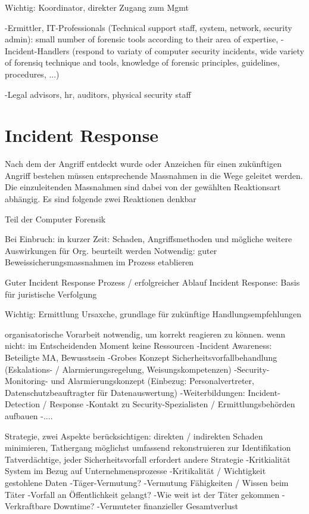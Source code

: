 Wichtig: Koordinator, direkter Zugang zum Mgmt

-Ermittler, IT-Professionals (Technical support staff, system, network, security admin): small number of forensic tools according to their area of expertise, 
-Incident-Handlers (respond to variaty of computer security incidents, wide variety of forensiq technique and tools, knowledge of forensic principles, guidelines, procedures, ...)

-Legal advisors, hr, auditors, physical security staff

\section{Incident Response}
Nach dem der Angriff entdeckt wurde oder Anzeichen für einen zukünftigen Angriff bestehen müssen entsprechende Massnahmen in die Wege geleitet werden. Die einzuleitenden Massnahmen sind dabei von der gewählten Reaktionsart abhängig. Es sind folgende zwei Reaktionen denkbar

Teil der Computer Forensik

Bei Einbruch: in kurzer Zeit: Schaden, Angriffsmethoden und mögliche weitere Auswirkungen für Org. beurteilt werden
Notwendig: guter Beweissicherungsmassnahmen im Prozess etablieren

Guter Incident Response Prozess / erfolgreicher Ablauf Incident Response: Basis für juristische Verfolgung

Wichtig: Ermittlung Ursaxche, grundlage für zukünftige Handlungsempfehlungen

organisatorische Vorarbeit notwendig, um korrekt reagieren zu können. wenn nicht: im Entscheidenden Moment keine Ressourcen
-Incident Awareness: Beteiligte MA, Bewusstsein
-Grobes Konzept Sicherheitsvorfallbehandlung (Eskalations- / Alarmierungsregelung, Weisungskompetenzen)
-Security-Monitoring- und Alarmierungskonzept (Einbezug: Personalvertreter, Datenschutzbeauftragter für Datenauswertung)
-Weiterbildungen: Incident-Detection / Response
-Kontakt zu Security-Spezialisten / Ermittlungsbehörden aufbauen
-....

Strategie, zwei Aspekte berücksichtigen: direkten / indirekten Schaden minimieren, Tathergang möglichst umfassend rekonstruieren zur Identifikation Tatverdächtige, jeder Sicherheitsvorfall erfordert andere Strategie
-Kritkialität System im Bezug auf Unternehmensprozesse
-Kritikalität / Wichtigkeit gestohlene Daten
-Täger-Vermutung?
-Vermutung Fähigkeiten / Wissen beim Täter
-Vorfall an Öffentlichkeit gelangt?
-Wie weit ist der Täter gekommen
-Verkraftbare Downtime?
-Vermuteter finanzieller Gesamtverlust

